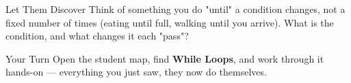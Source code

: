 \documentclass[aspectratio=169]{beamer}
\begin{document}
\begin{frame}{Let Them Discover}
    \Large
    Think of something you do "until" a condition changes, not a fixed number of times (eating until full, walking until you arrive). What is the condition, and what changes it each "pass"?
\end{frame}

\begin{frame}{Your Turn}
    \Large
    Open the student map, find \textbf{While Loops}, and work through it
    hands-on --- everything you just saw, they now do themselves.
\end{frame}
\end{document}
